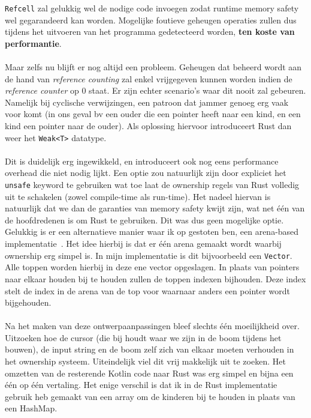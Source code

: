 \texttt{Refcell} zal gelukkig wel de nodige code invoegen zodat runtime memory safety wel gegarandeerd kan worden.
Mogelijke foutieve geheugen operaties zullen dus tijdens het uitvoeren van het programma gedetecteerd worden, \textbf{ten koste van performantie}.
\\ \\
Maar zelfs nu blijft er nog altijd een probleem.
Geheugen dat beheerd wordt aan de hand van \textit{reference counting} zal enkel vrijgegeven kunnen worden indien de \textit{reference counter} op 0 staat.
Er zijn echter scenario's waar dit nooit zal gebeuren.
Namelijk bij cyclische verwijzingen, een patroon dat jammer genoeg erg vaak voor komt (in ons geval bv een ouder die een pointer heeft naar een kind, en een kind een pointer naar de ouder).
Als oplossing hiervoor introduceert Rust dan weer het \texttt{Weak<T>} datatype.
\\ \\
Dit is duidelijk erg ingewikkeld, en introduceert ook nog eens performance overhead die niet nodig lijkt.
Een optie zou natuurlijk zijn door expliciet het \texttt{unsafe} keyword te gebruiken wat toe laat de ownership regels van Rust volledig uit te schakelen (zowel compile-time als run-time).
Het nadeel hiervan is natuurlijk dat we dan de garanties van memory safety kwijt zijn, wat net één van de hoofdredenen is om Rust te gebruiken.
Dit was dus geen mogelijke optie.
Gelukkig is er een alternatieve manier waar ik op gestoten ben, een arena-based implementatie~\cite{rust_arena_trees}.
Het idee hierbij is dat er één arena gemaakt wordt waarbij ownership erg simpel is.
In mijn implementatie is dit bijvoorbeeld een \texttt{Vector}.
Alle toppen worden hierbij in deze ene vector opgeslagen.
In plaats van pointers naar elkaar houden bij te houden zullen de toppen indexen bijhouden.
Deze index stelt de index in de arena van de top voor waarnaar anders een pointer wordt bijgehouden.
\\ \\
Na het maken van deze ontwerpaanpassingen bleef slechts één moeilijkheid over.
Uitzoeken hoe de cursor (die bij houdt waar we zijn in de boom tijdens het bouwen), de input string en de boom zelf zich van elkaar moeten verhouden in het ownership systeem.
Uiteindelijk viel dit vrij makkelijk uit te zoeken.
Het omzetten van de resterende Kotlin code naar Rust was erg simpel en bijna een één op één vertaling.
Het enige verschil is dat ik in de Rust implementatie gebruik heb gemaakt van een array om de kinderen bij te houden in plaats van een HashMap.

